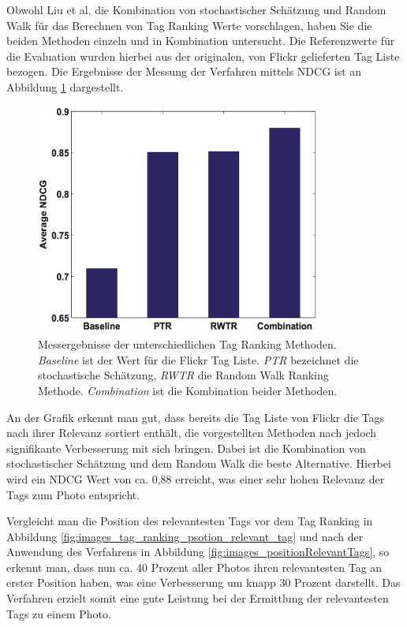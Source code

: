 Obwohl Liu et al. die Kombination von stochastischer Schätzung und Random Walk für das Berechnen von Tag Ranking Werte vorschlagen, haben Sie die beiden Methoden einzeln und in Kombination untersucht. Die Referenzwerte für die Evaluation wurden hierbei aus der originalen, von Flickr gelieferten Tag Liste bezogen. Die Ergebnisse der Messung der Verfahren mittels NDCG ist an Abbildung \ref{fig:images_ndcgAll} dargestellt.
\begin{figure}[htbp]
  \centering
    \includegraphics[height=3in]{images/ndcgAll.png}
  \caption{Messergebnisse der unterschiedlichen Tag Ranking Methoden. \emph{Baseline} ist der Wert für die Flickr Tag Liste. \emph{PTR} bezeichnet die stochastische Schätzung, \emph{RWTR} die Random Walk Ranking Methode. \emph{Combination} ist die Kombination beider Methoden.}
  \label{fig:images_ndcgAll}
\end{figure}

An der Grafik erkennt man gut, dass bereits die Tag Liste von Flickr die Tags nach ihrer Relevanz sortiert enthält, die vorgestellten Methoden nach \cite{ranking} jedoch signifikante Verbesserung mit sich bringen. Dabei ist die Kombination von stochastischer Schätzung und dem Random Walk die beste Alternative. Hierbei wird ein NDCG Wert von ca. 0,88 erreicht, was einer sehr hohen Relevanz der Tags zum Photo entspricht.

Vergleicht man die Position des relevantesten Tags vor dem Tag Ranking in Abbildung \ref{fig:images_tag_ranking_psotion_relevant_tag} und nach der Anwendung des Verfahrens in Abbildung \ref{fig:images_positionRelevantTags}, so erkennt man, dass nun ca. 40 Prozent aller Photos ihren relevantesten Tag an erster Position haben, was eine Verbesserung um knapp 30 Prozent darstellt. Das Verfahren erzielt somit eine gute Leistung bei der Ermittlung der relevantesten Tags zu einem Photo.

